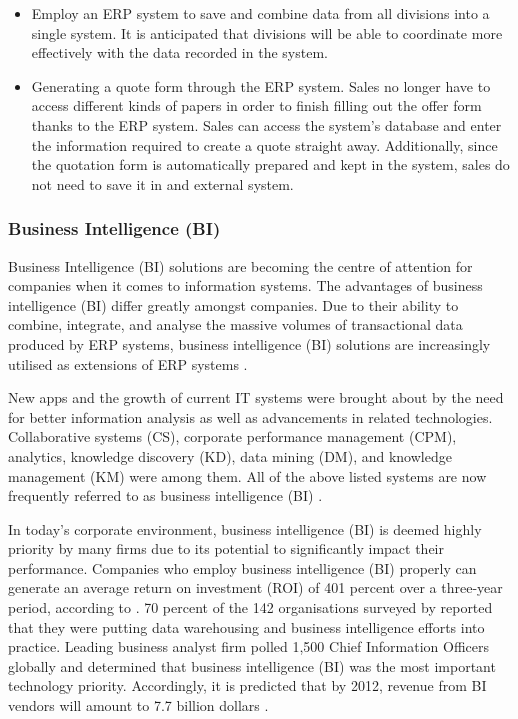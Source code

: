 \begin{itemize}
    \item Employ an ERP system to save and combine data from all divisions into a single system.
    It is anticipated that divisions will be able to coordinate more effectively with the data recorded in the system.
    \item Generating a quote form through the ERP system. Sales no longer have to access different kinds of papers in order to finish filling out the offer form thanks to the ERP system. Sales can access the system's database and enter the information required to create a quote straight away. Additionally, since the quotation form is automatically prepared and kept in the system, sales do not need to save it in and external system.
\end{itemize}
\subsubsection{Business Intelligence (BI)}
\par{Business Intelligence (BI) solutions are becoming the centre of attention for companies when it comes to information systems. The advantages of business intelligence (BI) differ greatly amongst companies. Due to their ability to combine, integrate, and analyse the massive volumes of transactional data produced by ERP systems, business intelligence (BI) solutions are increasingly utilised as extensions of ERP systems \citep{hawking2010business}.

New apps and the growth of current IT systems were brought about by the need for better information analysis as well as advancements in related technologies.
Collaborative systems (CS), corporate performance management (CPM), analytics, knowledge discovery (KD), data mining (DM), and knowledge management (KM) were among them. All of the above listed systems are now frequently referred to as business intelligence (BI) \citep{gibson2004evaluating,olszak2007approach}.

In today's corporate environment, business intelligence (BI) is deemed highly priority by many firms due to its potential to significantly impact their performance. Companies who employ business intelligence (BI) properly can generate an average return on investment (ROI) of 401 percent over a three-year period, according to \cite{power1998justifying}. 70 percent of the 142 organisations surveyed by \cite{herzum2003cutter} reported that they were putting data warehousing and business intelligence efforts into practice. Leading business analyst firm \cite{gartner2009gartner} polled 1,500 Chief Information Officers globally and determined that business intelligence (BI) was the most important technology priority. Accordingly, it is predicted that by 2012, revenue from BI vendors will amount to 7.7 billion dollars \citep{sommer2008gartner}.}
